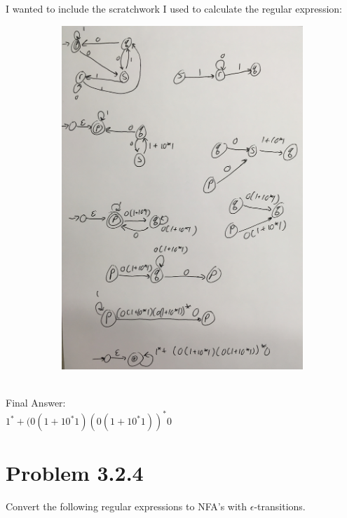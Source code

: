 \documentclass[20pt]{article} %
\begin{document}
I wanted to include the scratchwork I used to calculate the regular expression:
\begin{figure}[!htbp]
  	\centering
   	\begin{subfigure}[p]{0.6\linewidth}
    	\includegraphics[width=\linewidth]{./figures/h4-1.jpg}
   	\end{subfigure}
\end{figure} \\
Final Answer: \\ 
$1^{*}+(0(1+10^{*}1)(0(1+10^{*}1))^{*}0$

\newpage
\section{Problem 3.2.4}
Convert the following regular expressions to NFA's with $\epsilon$-transitions.
\end{document}
